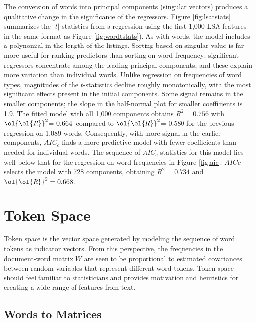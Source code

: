 \documentclass[12pt]{article}
\newcommand{\prs}{\mbox{$\ol{\ol{R}}^2$}}
\begin{document}
 The conversion of words into principal components (singular vectors) produces
 a qualitative change in
 the significance of the regressors.  Figure \ref{fig:lsatstats} summarizes the
 $|t|$-statistics from a regression using the first 1,000 LSA  features
 in the same format as Figure \ref{fig:wordtstats}).  As with words, the model
 includes a polynomial in the length of the listings.   Sorting based on singular value is far more
 useful for ranking predictors than sorting on word frequency:  significant regressors  concentrate among the leading principal components, and these explain more variation than individual words. Unlike regression on
 frequencies of word types,  magnitudes of the 
 $t$-statistics decline roughly monotonically, with the most
 significant effects present in the initial components. Some signal remains in the smaller components; the slope in the
 half-normal plot for smaller coefficients is 1.9.  The fitted model with all 1,000 
 components obtains $R^2 = 0.756$
 with \prs = 0.664, compared to \prs = 0.580 for the previous regression on
 1,089 words.  Consequently, with more signal in the earlier components, $AIC_c$
 finds a more predictive model with fewer coefficients than needed for
 individual words.  The sequence of $AIC_c$ statistics for this model lies well
 below that for the regression on word frequencies in Figure \ref{fig:aic}.
  $AICc$ selects the model with 728 components, obtaining $R^2 = 0.734$
 and $\prs = 0.668$.
 

 
\section{Token Space}
\label{sec:tokenspace}

 Token space is the vector space generated by modeling the sequence of word
 tokens as indicator vectors.  From this perspective, the frequencies in the
 document-word matrix $W$ are seen to be proportional to estimated covariances between random variables
 that represent different word tokens. Token space should feel
 familiar to statisticians and provides motivation and heuristics for
 creating a wide range of features from text.


\subsection{Words to Matrices} %
\label{sec:cca}
\end{document}
